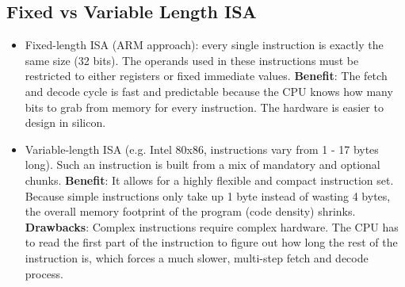 \documentclass[../comorg-part1.tex]{subfiles}
\begin{document}
\subsection{Fixed vs Variable Length ISA}
\begin{itemize}
    \item Fixed-length ISA (ARM approach): every single instruction is exactly the same size (32 bits).
    The operands used in these instructions must be restricted to either registers or fixed immediate values.\newline
    \textbf{Benefit}: The fetch and decode cycle is fast and predictable because the CPU knows how many bits to grab from memory for every instruction. The hardware is easier to design in silicon.
    \item Variable-length ISA (e.g. Intel 80x86, instructions vary from 1 - 17 bytes long). Such an instruction is built from a mix of mandatory and optional chunks.\newline
    \textbf{Benefit}: It allows for a highly flexible and compact instruction set. Because simple instructions only take up 1 byte instead of wasting 4 bytes, the overall memory footprint of the program (code density) shrinks.\newline
    \textbf{Drawbacks}: Complex instructions require complex hardware. The CPU has to read the first part of the instruction to figure out how long the rest of the instruction is, which forces a much slower, multi-step fetch and decode process.
\end{itemize}
\end{document}
